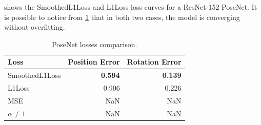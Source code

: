  shows the SmoothedL1Loss and L1Loss loss curves for a ResNet-152 PoseNet. It is possible to notice from \cref{tab:posenet-losses} that in both two cases, the model is converging without overfitting.

\begin{table}[htbp]
    \caption{PoseNet losses comparison.}
    \begin{center}
        \begin{tabular}{lrr}
            \toprule
            Loss            & {Position Error} & {Rotation Error} \\
            \midrule
            SmoothedL1Loss  & \textbf{0.594}   & \textbf{0.139}   \\
            L1Loss          & 0.906            & 0.226            \\
            MSE             & NaN              & NaN              \\
            $\alpha \neq 1$ & NaN              & NaN              \\
            \bottomrule
        \end{tabular}
        \label{tab:posenet-losses}
    \end{center}
\end{table}

